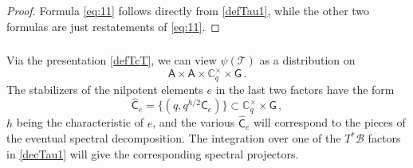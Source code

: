 \documentclass[14pt]{extarticle}
\newcommand{\Ct}{\mathbb{C}^\times}
\newcommand{\bA}{\mathsf{A}}
\newcommand{\bG}{\mathsf{G}}
\newcommand{\bC}{\mathsf{C}}
\newcommand{\bCh}{\widehat{\mathsf{C}}}
\newcommand{\bB}{\mathsf{B}}
\newcommand{\cT}{\mathscr{T}}
\newcommand{\cB}{\mathscr{B}}
\newcommand{\fg}{\mathfrak{g}}
\newcommand{\fn}{\mathfrak{n}}
\newcommand{\fb}{\mathfrak{b}}
\newcommand{\Tau}{\mathscr{T}}
\DeclareMathOperator{\rank}{rank}
\DeclareMathOperator{\virdim}{vir\ \!dim}
\theoremstyle{definition}
\begin{document}
\begin{proof}
  Formula \eqref{eq:11} follows directly from \eqref{defTau1},
  while the other two formulas are just restatements of
  \eqref{eq:11}. 
\end{proof}

\subsubsection{}

\noindent
Via the presentation \eqref{defTcT}, we can view $\psi(\cT)$ as a
distribution on
\[
  \bA \times \bA \times \Ct_q \times \bG \,. 
\]
The stabilizers of the nilpotent elements $e$ in the last two factors
have the form
%
\begin{equation}
  \bCh_e = \{  (q, q^{h/2} \bC_e) \} \subset \Ct_q \times
  \bG\label{eq:28}\,, 
\end{equation}
%
$h$ being the characteristic of $e$,
and the various $\bCh_e$  will correspond to the pieces of the eventual spectral
decomposition.
The integration over one of the $T^*\cB$ factors in
\eqref{decTau1} will give the corresponding spectral projectors.  





\end{document}
